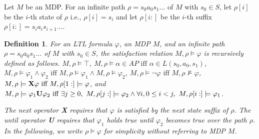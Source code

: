 \documentclass[letterpaper, 10 pt, conference]{ieeeconf}  %
\newtheorem{definition}{Definition}
\begin{document}
Let $ M $ be an MDP.
For an infinite path $\rho = s_0a_0s_1 \ldots $ of $ M $ with $ s_0 \in S $, let $\rho[i]$ be the $i$-th state of $\rho$ i.e., $\rho[i]=s_i$ and let $\rho[i:]$ be the $i$-th suffix $\rho[i:]=s_ia_is_{i+1} \ldots $.
\begin{definition}
	For an LTL formula $\varphi$, an MDP $M$, and an infinite path $\rho = s_0a_0s_1 \ldots$ of $ M $ with $ s_0 \in S $, the satisfaction relation $M,\rho \models \varphi$ is recursively defined as follows. $M, \rho \models \top$, $M, \rho \models \alpha \in AP \text{ iff } \alpha \in L(s_0,a_0,s_1)$, $M, \rho \models \varphi_1 \land \varphi_2 \text{ iff } M, \rho \models \varphi_1 \land M, \rho \models \varphi_2$, $M, \rho \models \neg \varphi \text{ iff } M, \rho \not\models \varphi$, $ M, \rho \models \text{{\bf X}}\varphi \text{ iff } M, \rho[1:] \models \varphi$, and $M, \rho \models \varphi_1 \text{{\bf U}} \varphi_2 \text{ iff } \exists j \geq 0, \ M, \rho[j:] \models \varphi_2 \land \forall i, 0\leq i < j, \ M, \rho[i:] \models \varphi_1$.

The next operator {\bf X} requires that $\varphi$ is satisfied by the next state suffix of $\rho$. The until operator {\bf U} requires that $\varphi_1$ holds true until $\varphi_2$ becomes true over the path $\rho$.
In the following, we write $ \rho \models \varphi $ for simplicity without referring to MDP $ M $.



\end{definition}
\end{document}
